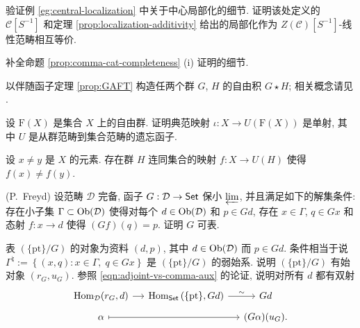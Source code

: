 \begin{Exercises}
	\item 验证例 \ref{eg:central-localization} 中关于中心局部化的细节. 证明该处定义的 $\mathcal{C}[S^{-1}]$ 和定理 \ref{prop:localization-additivity} 给出的局部化作为 $Z(\mathcal{C})[S^{-1}]$-线性范畴相互等价.

	\item 补全命题 \ref{prop:comma-cat-completeness} (i) 证明的细节.
	
	\item 以伴随函子定理 \ref{prop:GAFT} 构造任两个群 $G$, $H$ 的自由积 $G \star H$; 相关概念请见 \cite[定义 4.8.9]{Li1}.
	
	\item 设 $\mathrm{F}(X)$ 是集合 $X$ 上的自由群. 证明典范映射 $\iota: X \to U(\mathrm{F}(X))$ 是单射, 其中 $U$ 是从群范畴到集合范畴的遗忘函子.
	\begin{hint}
		设 $x \neq y$ 是 $X$ 的元素. 存在群 $H$ 连同集合的映射 $f: X \to U(H)$ 使得 $f(x) \neq f(y)$.
	\end{hint}

	\item (P.\ Freyd) 设范畴 $\mathcal{D}$ 完备, 函子 $G: \mathcal{D} \to \mathsf{Set}$ 保小 $\varprojlim$, 并且满足如下的解集条件: 存在小子集 $\Gamma \subset \operatorname{Ob}(\mathcal{D})$ 使得对每个 $d \in \operatorname{Ob}(\mathcal{D})$ 和 $p \in Gd$, 存在 $x \in \Gamma$, $q \in Gx$ 和态射 $f: x \to d$ 使得 $(Gf)(q) = p$. 证明 $G$ 可表.

	\begin{hint}
		表 $\left( \{\mathrm{pt}\} / G \right)$ 的对象为资料 $(d, p)$, 其中 $d \in \operatorname{Ob}(\mathcal{D})$ 而 $p \in Gd$. 条件相当于说 $\Gamma^\natural := \left\{ (x, q): x \in \Gamma, \; q \in Gx \right\}$ 是 $\left( \{\mathrm{pt}\} / G \right)$ 的弱始系. 说明 $\left( \{\mathrm{pt}\} / G \right)$ 有始对象 $(r_G, u_G)$. 参照 \eqref{eqn:adjoint-vs-comma-aux} 的论证, 说明对所有 $d$ 都有双射
		\[\begin{tikzcd}[row sep=tiny, column sep=small]
			\Hom_{\mathcal{D}}(r_G, d) \arrow[r] & \Hom_{\cate{Set}}\left( \{\mathrm{pt}\}, Gd \right) \arrow[r, "\sim"] & Gd \\
			\alpha \arrow[mapsto, rr] & & (G\alpha)(u_G) .
		\end{tikzcd}\]
	\end{hint}
\end{Exercises}